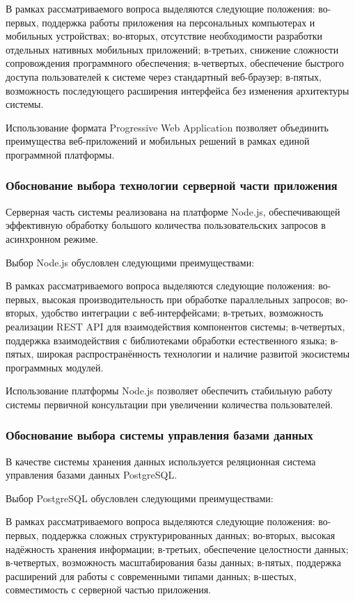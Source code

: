 \documentclass[14pt,a4paper]{extarticle}
\numberwithin{figure}{section}
\numberwithin{table}{section}
\begin{document}
В рамках рассматриваемого вопроса выделяются следующие положения: во-первых, поддержка работы приложения на персональных компьютерах и мобильных устройствах; во-вторых, отсутствие необходимости разработки отдельных нативных мобильных приложений; в-третьих, снижение сложности сопровождения программного обеспечения; в-четвертых, обеспечение быстрого доступа пользователей к системе через стандартный веб-браузер; в-пятых, возможность последующего расширения интерфейса без изменения архитектуры системы.


Использование формата Progressive Web Application позволяет объединить
преимущества веб-приложений и мобильных решений в рамках единой
программной платформы.

\subsubsection{Обоснование выбора технологии серверной части приложения}

Серверная часть системы реализована на платформе Node.js, обеспечивающей
эффективную обработку большого количества пользовательских запросов в
асинхронном режиме.

Выбор Node.js обусловлен следующими преимуществами:


В рамках рассматриваемого вопроса выделяются следующие положения: во-первых, высокая производительность при обработке параллельных запросов; во-вторых, удобство интеграции с веб-интерфейсами; в-третьих, возможность реализации REST API для взаимодействия компонентов системы; в-четвертых, поддержка взаимодействия с библиотеками обработки естественного языка; в-пятых, широкая распространённость технологии и наличие развитой экосистемы программных модулей.


Использование платформы Node.js позволяет обеспечить стабильную работу
системы первичной консультации при увеличении количества пользователей.

\subsubsection{Обоснование выбора системы управления базами данных}

В качестве системы хранения данных используется реляционная система
управления базами данных PostgreSQL.

Выбор PostgreSQL обусловлен следующими преимуществами:


В рамках рассматриваемого вопроса выделяются следующие положения: во-первых, поддержка сложных структурированных данных; во-вторых, высокая надёжность хранения информации; в-третьих, обеспечение целостности данных; в-четвертых, возможность масштабирования базы данных; в-пятых, поддержка расширений для работы с современными типами данных; в-шестых, совместимость с серверной частью приложения.
\end{document}
